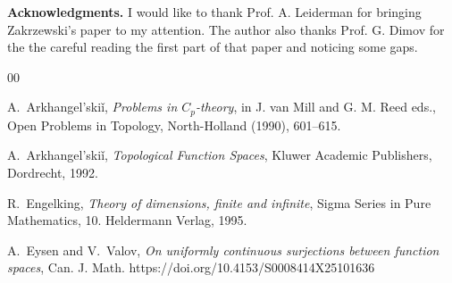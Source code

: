 \documentclass[12pt]{amsart}
\begin{document}
\textbf{Acknowledgments.} I would like to thank Prof. A. Leiderman for bringing Zakrzewski's paper to my attention. The author also thanks Prof. G. Dimov
for the the careful reading the first part of that paper and noticing some gaps. 

\begin{thebibliography}{00}

A.~Arkhangel'ski\v{i}, \textit{Problems in $C_p$-theory}, in J. van Mill and G. M. Reed eds., Open Problems in Topology, North-Holland (1990), 601--615.

A.~Arkhangel'ski\v{i}, \textit{Topological Function Spaces}, Kluwer Academic Publishers, Dordrecht, 1992.







R.~Engelking, \textit{Theory of dimensions, finite and infinite}, Sigma Series in Pure Mathematics, 10. Heldermann Verlag, 1995.


A.~Eysen and V.~Valov, \textit{On uniformly continuous surjections between function spaces}, Can. J. Math. https://doi.org/10.4153/S0008414X25101636



\end{thebibliography}
\end{document}
